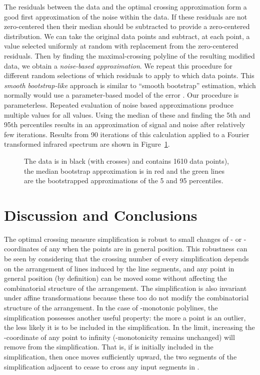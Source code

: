 \documentclass{article}
\begin{document}
The residuals between the data and the optimal crossing approximation form a good
first approximation of the noise within the data.  If these residuals are not
zero-centered then their median should be subtracted to provide a
zero-centered distribution.  We can take the original data points and
subtract, at each point, a value selected uniformly at random with
replacement from the zero-centered residuals.  Then by finding the
maximal-crossing polyline of the resulting modified data, we obtain a
\emph{noise-based approximation}.  We repeat this procedure for different random
selections of which residuals to apply to which data points.  This
\emph{smooth bootstrap-like} approach is similar to ``smooth bootstrap''
estimation, which normally would use a parameter-based model of the error
\cite{wilcox:2010fk}.  Our procedure is parameterless.  Repeated evaluation
of noise based approximations produce multiple  values for all  values. 
Using the median of these and finding the 5th and 95th percentiles results
in an approximation of signal and noise after relatively few iterations.  Results
from 90 iterations of this calculation applied to a Fourier transformed
infrared spectrum are shown in Figure~\ref{fig:ftir}.

\begin{figure}
	\qquad
\caption{The data is in black (with crosses) and contains 1610 data points), the median bootstrap approximation is in red and the green lines are the bootstrapped approximations of the 5 and 95 percentiles.}
\label{fig:ftir}
\end{figure} 


\section{Discussion and Conclusions}
\label{sect:discconc}

The optimal crossing measure simplification is robust to small changes
of - or -coordinates of any  when the points are in general
position. This robustness can be seen by considering that the crossing
number of every simplification depends on the arrangement of lines
induced by the line segments, and any point in general position (by
definition) can be moved some  without affecting the
combinatorial structure of the arrangement. The simplification is also
invariant under affine transformations because these too do not modify
the combinatorial structure of the arrangement. In the case of
-monotonic polylines, the simplification possesses another useful
property: the more a point is an outlier, the less likely it is to be
included in the simplification. In the limit, increasing the
-coordinate of any point  to infinity (-monotonicity
remains unchanged) will remove  from the simplification. That is,
if  is initially included in the simplification, then once 
moves sufficiently upward, the two segments of the simplification
adjacent to  cease to cross any input segments in .
\end{document}
